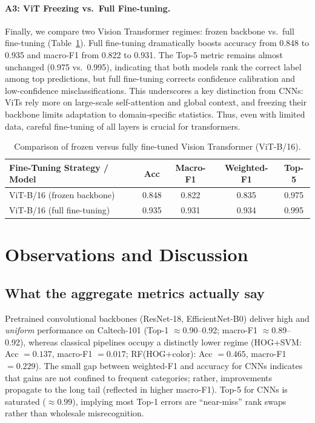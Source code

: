 \documentclass[11pt]{article}
\begin{document}
\paragraph{A3: ViT Freezing vs.\ Full Fine-tuning.}
Finally, we compare two Vision Transformer regimes: frozen backbone vs.\ full fine-tuning
(Table~\ref{tab:abl_vit}).
Full fine-tuning dramatically boosts accuracy from 0.848 to 0.935 and macro-F1 from 0.822 to 0.931.
The Top-5 metric remains almost unchanged (0.975 vs.\ 0.995),
indicating that both models rank the correct label among top predictions,
but full fine-tuning corrects confidence calibration and low-confidence misclassifications.
This underscores a key distinction from CNNs:
ViTs rely more on large-scale self-attention and global context,
and freezing their backbone limits adaptation to domain-specific statistics.
Thus, even with limited data, careful fine-tuning of all layers is crucial for transformers.

\begin{table}[H]
  \centering
  \begin{tabular}{lcccc}
    \toprule
    \textbf{Fine-Tuning Strategy / Model} & \textbf{Acc} & \textbf{Macro-F1} & \textbf{Weighted-F1} & \textbf{Top-5} \\
    \midrule
    ViT-B/16 (frozen backbone) & 0.848 & 0.822 & 0.835 & 0.975 \\
    ViT-B/16 (full fine-tuning) & 0.935 & 0.931 & 0.934 & 0.995 \\
    \bottomrule
  \end{tabular}
  \caption{Comparison of frozen versus fully fine-tuned Vision Transformer (ViT-B/16).}
  \label{tab:abl_vit}
\end{table}

\section{Observations and Discussion}

\subsection{What the aggregate metrics actually say}
Pretrained convolutional backbones (ResNet-18, EfficientNet-B0) deliver high and \emph{uniform} performance on Caltech-101 (Top-1 $\approx$0.90–0.92; macro-F1 $\approx$0.89–0.92), whereas classical pipelines occupy a distinctly lower regime (HOG+SVM: Acc $=0.137$, macro-F1 $=0.017$; RF(HOG+color): Acc $=0.465$, macro-F1 $=0.229$). The small gap between weighted-F1 and accuracy for CNNs indicates that gains are not confined to frequent categories; rather, improvements propagate to the long tail (reflected in higher macro-F1). Top-5 for CNNs is saturated ($\approx 0.99$), implying most Top-1 errors are “near-miss” rank swaps rather than wholesale misrecognition.
\end{document}

